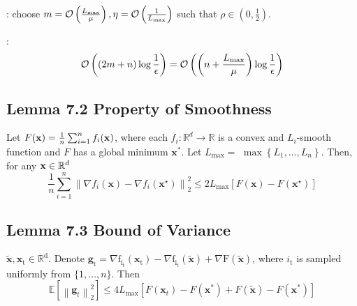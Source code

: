 : choose $m=\operatorname{\mathcal{O}}\left(\frac{L_{\max }}{\mu}\right), \eta=\operatorname{\mathcal{O}}\left(\frac{1}{L_{\max }}\right)$ such that $\rho \in\left(0, \frac{1}{2}\right)$.

:
$$
\operatorname{\mathcal{O}}\left((2 m+n) \log \frac{1}{\epsilon}\right)=\operatorname{\mathcal{O}}\left(\left(n+\frac{L_{\max }}{\mu}\right) \log \frac{1}{\epsilon}\right)
$$







\subsection*{Lemma 7.2 Property of Smoothness}
Let $F(\mathbf{x})=\frac{1}{n} \sum_{i=1}^{n} f_{i}(\operatorname{\boldsymbol{\mathbf{x}}})$, where each $f_{i}: \mathbb{R}^{{d}} \rightarrow \mathbb{R}$ is a convex and ${L}_{{i}}$-smooth function and ${F}$ has a global minimum $\mathbf{x}^{*}$. Let ${L}_{\max }=$ $\max \left\{{L}_{1}, \ldots, {L}_{n}\right\}$. Then, for any $\boldsymbol{\mathbf{x}} \in \mathbb{R}^{{d}}$
$$
\frac{1}{n} \sum_{i=1}^{n}\left\|\nabla f_{i}(\mathbf{x})-\nabla f_{i}\left(\mathbf{x}^{\star}\right)\right\|_{2}^{2} \leq 2 L_{\max }\left[F(\mathbf{x})-F\left(\mathbf{x}^{\star}\right)\right]
$$



\subsection*{Lemma 7.3 Bound of Variance}
$\tilde{\mathbf{x}}, \mathbf{x}_{\mathrm{t}} \in \mathbb{R}^{\mathrm{d}}$. Denote $\mathbf{g}_{\mathrm{t}}=\nabla \mathrm{f}_{\mathrm{i}_{\mathrm{t}}}\left(\mathbf{x}_{\mathrm{t}}\right)-\nabla \mathrm{f}_{\mathrm{i}_{\mathrm{t}}}(\tilde{\mathbf{x}})+\nabla \mathrm{F}(\tilde{\mathbf{x}})$, where $i_{\mathrm{t}}$ is sampled uniformly from $\{1, \ldots, n\}$. Then
$$
\mathbb{E}\left[\left\|\mathbf{g}_{t}\right\|_{2}^{2}\right] \leq 4 L_{\max }\left[F\left(\mathbf{x}_{t}\right)-F\left(\mathbf{x}^{*}\right)+F(\tilde{\mathbf{x}})-F\left(\mathbf{x}^{*}\right)\right]
$$